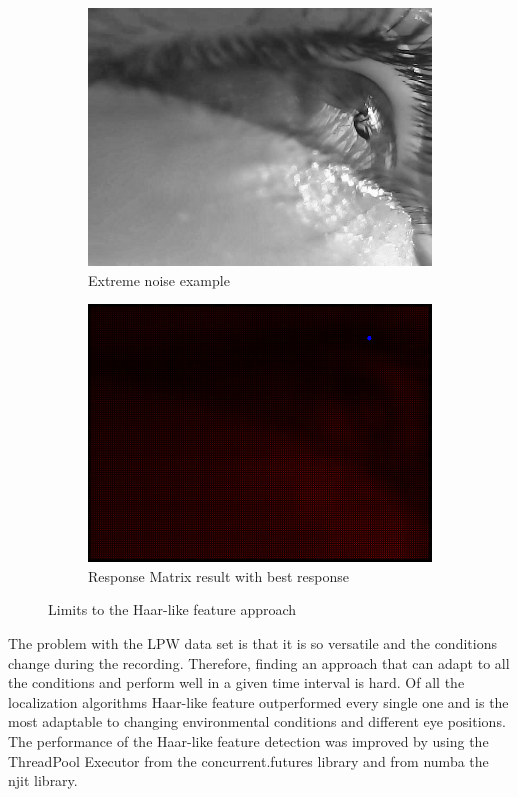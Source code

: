 \begin{figure}[h]
    \centering
    \begin{subfigure}{0.5\textwidth}
        \centering
        \includegraphics[width=0.9\linewidth]{plots/results/originalworst.png}
        \caption{Extreme noise example}
    \end{subfigure}%
    \hfill
    \begin{subfigure}{0.5\textwidth}
        \centering
        \includegraphics[width=0.9\linewidth]{plots/results/responsehaarworst.png}
        \caption{Response Matrix result with best response}
    \end{subfigure}%
 
    \caption{Limits to the Haar-like feature approach}
    \label{fig:limit_haar}
\end{figure}
The problem with the LPW data set is that it is so versatile and the conditions change during the recording. Therefore, finding an approach that can adapt to all the conditions and perform well in a given time interval is hard. Of all the localization algorithms Haar-like feature outperformed every single one and is the most adaptable to changing environmental conditions and different eye positions. The performance of the Haar-like feature detection was improved by using the ThreadPool Executor from the concurrent.futures library and from numba the njit library.

